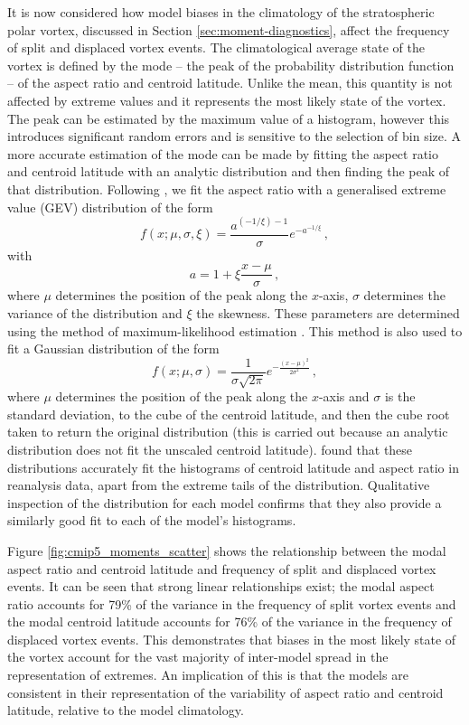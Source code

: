 It is now considered how model biases in the climatology of the stratospheric
polar vortex, discussed in Section \ref{sec:moment-diagnostics}, affect the
frequency of split and displaced vortex events. The climatological average state
of the vortex is defined by the mode -- the peak of the probability distribution
function -- of the aspect ratio and centroid latitude. Unlike the mean, this
quantity is not affected by extreme values and it represents the most likely
state of the vortex. The peak can be estimated by the maximum value of a
histogram, however this introduces significant random errors and is sensitive to
the selection of bin size. A more accurate estimation of the mode can be made by
fitting the aspect ratio and centroid latitude with an analytic distribution and
then finding the peak of that distribution. Following \citet{Mitchell2011}, we
fit the aspect ratio with a generalised extreme value (GEV) distribution of the
form
\begin{equation}
  f(x;\mu,\sigma,\xi) = \frac{a^{(-1/\xi)-1}}{\sigma}e^{{-a}^{-1/\xi}}
  \, , 
\end{equation}
with
\begin{equation} 
a = 1 + \xi \frac{x-\mu}{\sigma} \, ,
\end{equation}
where $\mu$ determines the position of the peak along the $x$-axis, $\sigma$
determines the variance of the distribution and $\xi$ the skewness. These
parameters are determined using the method of maximum-likelihood estimation
\citep{Wilks}. This method is also used to fit a Gaussian distribution of the
form
\begin{equation}
f(x;\mu,\sigma) = \frac{1}{\sigma\sqrt{2\pi}} e^{
  -\frac{(x-\mu)^2}{2\sigma^{2}}} \, , 
\end{equation}
where $\mu$ determines the position of the peak along the $x$-axis and $\sigma$
is the standard deviation, to the cube of the centroid latitude, and then the
cube root taken to return the original distribution (this is carried out because
an analytic distribution does not fit the unscaled centroid
latitude). \citet{Mitchell2011} found that these distributions accurately fit
the histograms of centroid latitude and aspect ratio in reanalysis data, apart
from the extreme tails of the distribution. Qualitative inspection of the
distribution for each model confirms that they also provide a similarly good fit
to each of the model's histograms.

Figure \ref{fig:cmip5_moments_scatter} shows the relationship between the modal
aspect ratio and centroid latitude and frequency of split and displaced vortex
events. It can be seen that strong linear relationships exist; the modal aspect
ratio accounts for 79\% of the variance in the frequency of split vortex events
and the modal centroid latitude accounts for 76\% of the variance in the
frequency of displaced vortex events. This demonstrates that biases in the most
likely state of the vortex account for the vast majority of inter-model spread
in the representation of extremes. An implication of this is that the models are
consistent in their representation of the variability of aspect ratio and
centroid latitude, relative to the model climatology.

